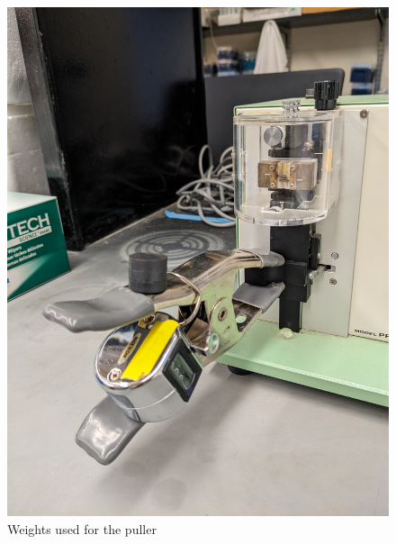 \documentclass[
  letterpaper,
  DIV=11,
  numbers=noendperiod]{scrartcl}
\begin{document}
\begin{figure}
\begin{minipage}[t]{0.50\linewidth}
{{\includegraphics{micro_photos/included/puller_weight.jpg}

}

}

\end{minipage}%

\caption{\label{fig-eggs}Weights used for the puller}

\end{figure}
\end{document}
